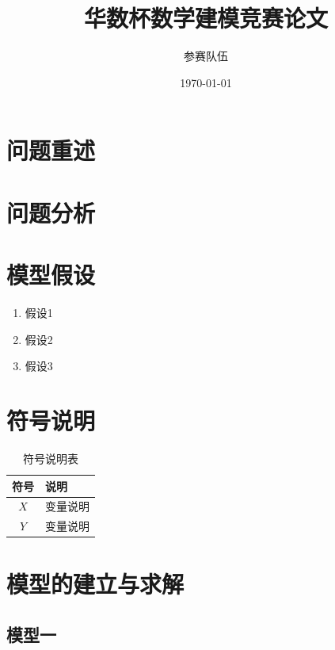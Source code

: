 \documentclass[12pt,a4paper]{article}
\title{华数杯数学建模竞赛论文}
\author{参赛队伍}
\date{\today}
\begin{document}
\maketitle

\newpage
\tableofcontents
\newpage

\section{问题重述}


\section{问题分析}


\section{模型假设}

\begin{enumerate}
    \item 假设1
    \item 假设2
    \item 假设3
\end{enumerate}

\section{符号说明}

\begin{table}[H]
\centering
\begin{tabular}{cl}
\toprule
符号 & 说明 \\
\midrule
$X$ & 变量说明 \\
$Y$ & 变量说明 \\
\bottomrule
\end{tabular}
\caption{符号说明表}
\end{table}

\section{模型的建立与求解}

\subsection{模型一}

\end{document}
